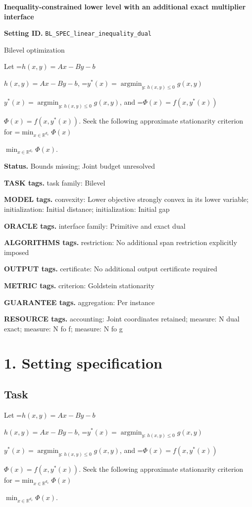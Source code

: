 \documentclass[10pt,a4paper]{article}
\newcommand{\AtlasMath}[1]{\par\begingroup\centering\setbox0=\hbox{$\displaystyle #1$}\ifdim\wd0>1.4\linewidth\typeout{ATLAS WIDE FORMULA: \the\wd0}\fi\ifdim\wd0>\linewidth\resizebox{\linewidth}{!}{\box0}\else\box0\fi\par\endgroup}
\newcommand{\AtlasInlineMath}[1]{\begingroup\setbox0=\hbox{$#1$}\ifdim\wd0>.4\linewidth\endgroup\AtlasMath{#1}\else\endgroup$#1$\fi}
\begin{document}
\raggedright

{\LARGE\bfseries\sffamily\color{AtlasNavy} Inequality-constrained lower level with an additional exact multiplier interface\par}\vspace{5pt}
\textbf{Setting ID.} \texttt{BL\_\allowbreak{}SPEC\_\allowbreak{}linear\_\allowbreak{}inequality\_\allowbreak{}dual}

Bilevel optimization

Let \AtlasInlineMath{h(x,y)=Ax-By-b}, \AtlasInlineMath{y^*(x)=\operatorname*{argmin}_{y:\,h(x,y)\le0}g(x,y)}, and \AtlasInlineMath{\Phi(x)=f(x,y^*(x))}. Seek the following approximate stationarity criterion for \AtlasInlineMath{\min_{x\in \mathbb{R}^{d_x}}\Phi(x)}.

\textbf{Status.} Bounds missing; Joint budget unresolved

\textbf{TASK tags.} task family: Bilevel

\textbf{MODEL tags.} convexity: Lower objective strongly convex in its lower variable; initialization: Initial distance; initialization: Initial gap

\textbf{ORACLE tags.} interface family: Primitive and exact dual

\textbf{ALGORITHMS tags.} restriction: No additional span restriction explicitly imposed

\textbf{OUTPUT tags.} certificate: No additional output certificate required

\textbf{METRIC tags.} criterion: Goldstein stationarity

\textbf{GUARANTEE tags.} aggregation: Per instance

\textbf{RESOURCE tags.} accounting: Joint coordinates retained; measure: N dual exact; measure: N fo f; measure: N fo g

\section{1. Setting specification}
\subsection{Task}
Let \AtlasInlineMath{h(x,y)=Ax-By-b}, \AtlasInlineMath{y^*(x)=\operatorname*{argmin}_{y:\,h(x,y)\le0}g(x,y)}, and \AtlasInlineMath{\Phi(x)=f(x,y^*(x))}. Seek the following approximate stationarity criterion for \AtlasInlineMath{\min_{x\in \mathbb{R}^{d_x}}\Phi(x)}.
\end{document}

